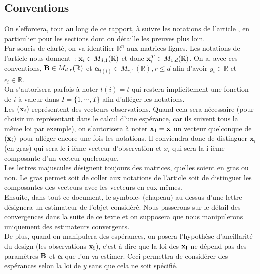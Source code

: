 \documentclass[12pt]{article}
\begin{document}
\subsection{Conventions}
On s'efforcera, tout au long de ce rapport, à suivre les notations de l'article \cite{MTLR_1}, en particulier pour les sections dont on détaille les preuves plus loin.\\

\noindent Par soucis de clarté, on va identifier $\mathbb{R}^n$ aux matrices lignes. Les notations de l'article nous donnent~: ${\bf x}_i \in M_{d, 1}(\mathbb{R})$ et donc ${\bf x}^T_i \in M_{1, d}(\mathbb{R})$. On a, avec ces conventions, ${\bf B} \in M_{d, r}(\mathbb{R})$ et ${\bm \alpha}_{t(i)}\in M_{r, 1}(\mathbb{R}), r \leq d$ afin d'avoir $y_i \in \mathbb{R}$ et $\epsilon_i \in \mathbb{R}$. \\

\noindent On s'autorisera parfois à noter $t(i) = t$ qui restera implicitement une fonction de $i$ à valeur dans $I = \{1, \cdots, T\}$ afin d'alléger les notations.\\
Les $({\bf x}_i)$ représentent des vecteurs observations. Quand cela sera nécessaire (pour choisir un représentant dans le calcul d'une espérance, car ils suivent tous la même loi par exemple), on s'autorisera à noter ${\bf x}_1 = {\bf x}$ un vecteur quelconque de $({\bf x}_i)$ pour alléger encore une fois les notations.
Il conviendra donc de distinguer $\textbf{x}_i$ (en gras) qui sera le i-ième vecteur d'observation et $x_i$ qui sera la i-ième composante d'un vecteur quelconque.\\
Les lettres majuscules désignent toujours des matrices, quelles soient en gras ou non. Le gras permet soit de coller aux notations de l'article soit de distinguer les composantes des vecteurs avec les vecteurs en eux-mêmes.\\

\noindent Ensuite, dans tout ce document, le symbole $\hat{ }$ (chapeau) au-dessus d'une lettre désignera un estimateur de l'objet considéré. Nous passerons sur le détail des convergences dans la suite de ce texte et on supposera que nous manipulerons uniquement des estimateurs convergents.\\
De plus, quand on manipulera des espérances, on posera l'hypothèse d'ancillarité du design (les observations $\bf x_i$), c'est-à-dire que la loi des $\bf x_i$ ne dépend pas des paramètres $\bf B$ et $\bm{\alpha}$ que l'on va estimer. Ceci permettra de considérer des espérances selon la loi de $y$ sans que cela ne soit spécifié. 
\end{document}
